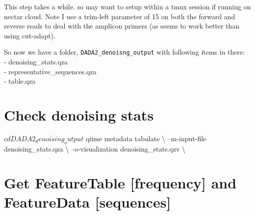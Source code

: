 \documentclass[]{book}
\newenvironment{Shaded}{\begin{snugshade}}{\end{snugshade}}
\newcommand{\BuiltInTok}[1]{#1}
\newcommand{\ExtensionTok}[1]{#1}
\newcommand{\NormalTok}[1]{#1}
\newcommand{\OperatorTok}[1]{\textcolor[rgb]{0.81,0.36,0.00}{\textbf{#1}}}
\begin{document}
This step takes a while. so may want to setup within a tmux session if running on nectar cloud. Note I use a trim-left parameter of 15 on both the forward and reverse reads to deal with the amplicon primers (as seems to work better than using cut-adapt).

\begin{Shaded}
\end{Shaded}

So now we have a folder, \texttt{DADA2\_denoisng\_output} with following items in there:\\
- denoising\_stats.qza\\
- representative\_sequences.qza\\
- table.qza

\hypertarget{check-denoising-stats}{%
\section{Check denoising stats}\label{check-denoising-stats}}

\begin{Shaded}
\begin{Highlighting}[]
\NormalTok{$ }\BuiltInTok{cd}\NormalTok{ DADA2_denoising_output}

\NormalTok{$ }\ExtensionTok{qiime}\NormalTok{ metadata tabulate \textbackslash{}}
\NormalTok{--m-input-file denoising_stats.qza \textbackslash{}}
\NormalTok{--o-visualization denoising_stats.qzv \textbackslash{}}
\end{Highlighting}
\end{Shaded}

\hypertarget{get-featuretable-frequency-and-featuredata-sequences}{%
\section{Get FeatureTable {[}frequency{]} and FeatureData {[}sequences{]}}\label{get-featuretable-frequency-and-featuredata-sequences}}
\end{document}
